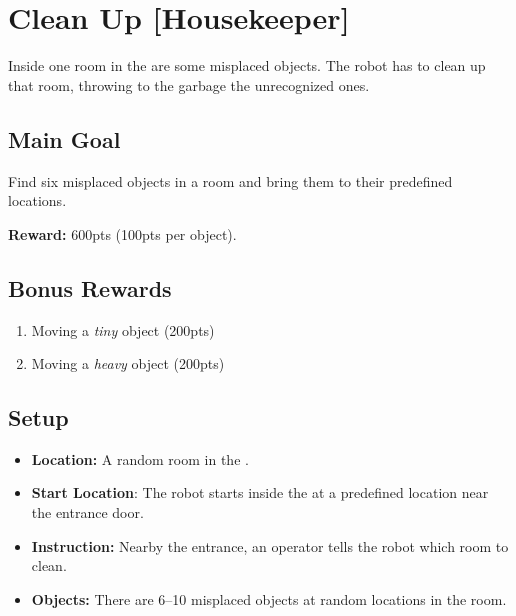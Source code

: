 \section{Clean Up [Housekeeper]}
\label{test:clean-up}
Inside one room in the \Arena{} are some misplaced objects. The robot has to clean up that room, throwing to the garbage the unrecognized ones.


\subsection*{Main Goal}
Find six misplaced objects in a room and bring them to their predefined locations.

\noindent\textbf{Reward:} 600pts (100pts per object).

\subsection*{Bonus Rewards}
\begin{enumerate}[nosep]
	\item Moving a \emph{tiny} object (200pts)
	\item Moving a \emph{heavy} object (200pts)
\end{enumerate}


\subsection*{Setup}
\begin{itemize}[nosep]
	\item \textbf{Location:} A random room in the \Arena{}.
	\item \textbf{Start Location}: The robot starts inside the \Arena{} at a predefined location near the entrance door.
	\item \textbf{Instruction:} Nearby the entrance, an operator tells the robot which room to clean.
	\item \textbf{Objects:} There are 6--10 misplaced objects at random locations in the room.
\end{itemize}

